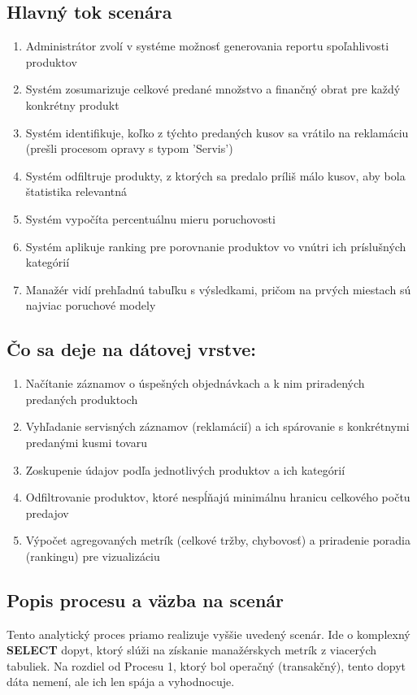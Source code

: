 \documentclass[11pt, a4paper]{article}
\begin{document}
\subsection*{Hlavný tok scenára}
\begin{enumerate}
    \item Administrátor zvolí v systéme možnosť generovania reportu spoľahlivosti produktov
    \item Systém zosumarizuje celkové predané množstvo a finančný obrat pre každý konkrétny produkt
    \item Systém identifikuje, koľko z týchto predaných kusov sa vrátilo na reklamáciu (prešli procesom opravy s typom 'Servis')
    \item Systém odfiltruje produkty, z ktorých sa predalo príliš málo kusov, aby bola štatistika relevantná
    \item Systém vypočíta percentuálnu mieru poruchovosti
    \item Systém aplikuje ranking pre porovnanie produktov vo vnútri ich príslušných kategórií
    \item Manažér vidí prehľadnú tabuľku s výsledkami, pričom na prvých miestach sú najviac poruchové modely
\end{enumerate}

\subsection*{Čo sa deje na dátovej vrstve:}
\begin{enumerate}
    \item Načítanie záznamov o úspešných objednávkach a k nim priradených predaných produktoch
    \item Vyhľadanie servisných záznamov (reklamácií) a ich spárovanie s konkrétnymi predanými kusmi tovaru
    \item Zoskupenie údajov podľa jednotlivých produktov a ich kategórií
    \item Odfiltrovanie produktov, ktoré nespĺňajú minimálnu hranicu celkového počtu predajov
    \item Výpočet agregovaných metrík (celkové tržby, chybovosť) a priradenie poradia (rankingu) pre vizualizáciu
\end{enumerate}

\subsection{Popis procesu a väzba na scenár}
Tento analytický proces priamo realizuje vyššie uvedený scenár. Ide o komplexný \textbf{SELECT} dopyt, ktorý slúži na získanie manažérskych metrík z viacerých tabuliek. Na rozdiel od Procesu 1, ktorý bol operačný (transakčný), tento dopyt dáta nemení, ale ich len spája a vyhodnocuje. 
\end{document}
